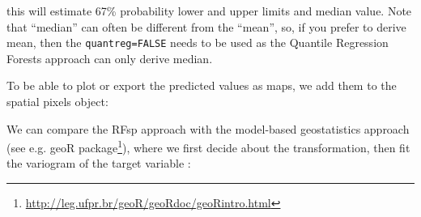 \documentclass[graybox,natbib,nospthms,UStrade]{svmono}
\newenvironment{Shaded}{\begin{snugshade}}{\end{snugshade}}
\newcommand{\CommentTok}[1]{\textcolor[rgb]{0.37,0.37,0.37}{\textit{#1}}}
\newcommand{\DataTypeTok}[1]{\textcolor[rgb]{0.27,0.27,0.27}{#1}}
\newcommand{\DecValTok}[1]{\textcolor[rgb]{0.06,0.06,0.06}{#1}}
\newcommand{\FloatTok}[1]{\textcolor[rgb]{0.06,0.06,0.06}{#1}}
\newcommand{\KeywordTok}[1]{\textcolor[rgb]{0.27,0.27,0.27}{\textbf{#1}}}
\newcommand{\NormalTok}[1]{#1}
\newcommand{\OperatorTok}[1]{\textcolor[rgb]{0.43,0.43,0.43}{\textbf{#1}}}
\newcommand{\StringTok}[1]{\textcolor[rgb]{0.5,0.5,0.5}{#1}}
\renewcommand{\href}[2]{#2 (\url{#1})}
\renewcommand{\href}[2]{#2\footnote{\url{#1}}}
\begin{document}
\begin{Shaded}
\end{Shaded}

this will estimate 67\% probability lower and upper limits and median value. Note that ``median'' can often be different from the ``mean'', so, if you prefer to derive mean, then the \texttt{quantreg=FALSE} needs to be used as the Quantile Regression Forests approach can only derive median.

To be able to plot or export the predicted values as maps, we add them to the spatial pixels object:

\begin{Shaded}
\end{Shaded}

We can compare the RFsp approach with the model-based geostatistics approach (see e.g. \href{http://leg.ufpr.br/geoR/geoRdoc/geoRintro.html}{geoR package}), where we first decide about the transformation, then fit the variogram of the target variable \citep{Diggle2007Springer, Brown2014JSS}:
\end{document}
